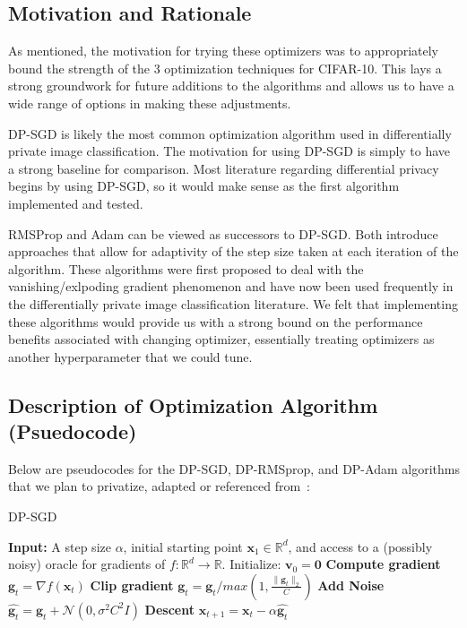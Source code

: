 \subsection{Motivation and Rationale}\label{subsec:motivation-and-rationale}

As mentioned, the motivation for trying these optimizers was to appropriately bound the strength of the 3 optimization techniques for CIFAR-10. 
This lays a strong groundwork for future additions to the algorithms and allows us to have a wide range of options in making these adjustments. 

DP-SGD is likely the most common optimization algorithm used in differentially private image classification. The motivation for using DP-SGD is simply to have a strong 
baseline for comparison. Most literature regarding differential privacy begins by using DP-SGD, so it would make sense as the first algorithm implemented and tested.

RMSProp and Adam can be viewed as successors to DP-SGD. Both introduce approaches that allow for adaptivity of the step size taken at each iteration of the algorithm. These algorithms
were first proposed to deal with the vanishing/exlpoding gradient phenomenon and have now been used frequently in the differentially private image classification literature. We felt that
implementing these algorithms would provide us with a strong bound on the performance benefits associated with changing optimizer, essentially treating optimizers as another hyperparameter
that we could tune.

\subsection{Description of Optimization Algorithm (Psuedocode)}\label{subsec:algorithm-description}

Below are pseudocodes for the DP-SGD, DP-RMSprop, and DP-Adam algorithms that we plan to privatize, adapted or referenced from~\cite{DBLP:journals/corr/abs-1807-06766}:
\begin{algorithm}
    \caption{DP-SGD}
    \label{alg:sgd}
    \begin{algorithmic}[1]
        \State \textbf{Input:} A step size $\alpha$, initial starting point $\mathbf{x}_1 \in \mathbb{R}^d$,
        and access to a (possibly noisy) oracle for gradients of $f : \mathbb{R}^d \rightarrow \mathbb{R}$.
            \State Initialize: $\mathbf{v}_0 = \mathbf{0}$
                \State \textbf{Compute gradient}
                \State $\mathbf{g}_t = \nabla f(\mathbf{x}_t)$
                \State \textbf{Clip gradient}
                \State $\mathbf{g}_t = \mathbf{g}_t/max(1, \frac{\lVert \mathbf{g}_t \rVert_{2} }{C})$
                \State \textbf{Add Noise}
                \State $\hat{\mathbf{g}_t} = \mathbf{g}_t + \mathcal{N}(0,\sigma^{2}C^{2}I)$
                \State \textbf{Descent}
                \State $\mathbf{x}_{t+1} = \mathbf{x}_t - \alpha \hat{\mathbf{g}_t}$
            \EndFor
        \EndFunction
    \end{algorithmic}
\end{algorithm}
\vspace{-1cm}

